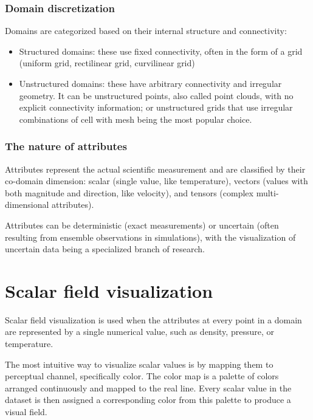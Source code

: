\subsubsection{Domain discretization}
Domains are categorized based on their internal structure and connectivity: 
\begin{itemize}[noitemsep]
    \item Structured domains: these use fixed connectivity, often in the form of a grid (uniform grid, rectilinear grid, curvilinear grid)
    \item Unstructured domains: these have arbitrary connectivity and irregular geometry. It can be unstructured points, also called point clouds, with no explicit connectivity information; or unstructured grids that use irregular combinations of cell with mesh being the most popular choice.
\end{itemize}

\subsubsection{The nature of attributes}
Attributes represent the actual scientific measurement and are classified by their co-domain dimension: scalar (single value, like temperature), vectors (values with both magnitude and direction, like velocity), and tensors (complex multi-dimensional attributes). \par
Attributes can be deterministic (exact measurements) or uncertain (often resulting from ensemble observations in simulations), with the visualization of uncertain data being a specialized branch of research.

\section{Scalar field visualization}
Scalar field visualization is used when the attributes at every point in a domain are represented by a single numerical value, such as density, pressure, or temperature.\par
The most intuitive way to visualize scalar values is by mapping them to perceptual channel, specifically color. The color map is a palette of colors arranged continuously and mapped to the real line. Every scalar value in the dataset is then assigned a corresponding color from this palette to produce a visual field.

